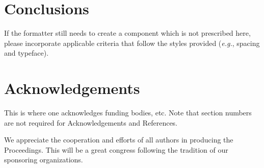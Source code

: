 \documentclass[IAHRdraft]{IAHRYPN}
\begin{document}
\section{Conclusions}
If the formatter still needs to create a component which is not prescribed here, please incorporate applicable criteria that follow the styles provided (\emph{e.g.}, spacing and typeface). 

\section{Acknowledgements}
This is where one acknowledges funding bodies, etc. Note that section numbers are not required for Acknowledgements and References. 

We appreciate the cooperation and efforts of all authors in producing the Proceedings.  This will be a great congress following the tradition of our sponsoring organizations.




\end{document}
